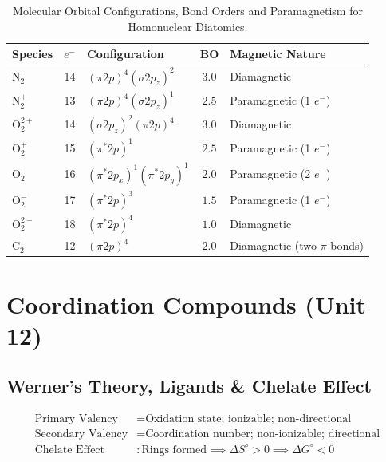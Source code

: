 \documentclass[10pt,twoside,openright]{book}
\begin{document}
\begin{table}[htbp]
\centering
{\fontsize{7.5pt}{9.0pt}\selectfont\setlength{\tabcolsep}{1.5pt}
\renewcommand{\arraystretch}{1.15}
\begin{tabularx}{\linewidth}{l c l c >{\RaggedRight}X}
\toprule
\textbf{Species} & \textbf{$e^-$} & \textbf{Configuration} & \textbf{BO} & \textbf{Magnetic Nature} \\
\midrule
$\text{N}_2$ & 14 & $(\pi 2p)^4 (\sigma 2p_z)^2$ & $3.0$ & Diamagnetic \\
$\text{N}_2^+$ & 13 & $(\pi 2p)^4 (\sigma 2p_z)^1$ & $2.5$ & Paramagnetic (1 $e^-$) \\
$\text{O}_2^{2+}$ & 14 & $(\sigma 2p_z)^2 (\pi 2p)^4$ & $3.0$ & Diamagnetic \\
$\text{O}_2^+$ & 15 & $(\pi^* 2p)^1$ & $2.5$ & Paramagnetic (1 $e^-$) \\
$\text{O}_2$ & 16 & $(\pi^* 2p_x)^1 (\pi^* 2p_y)^1$ & $2.0$ & Paramagnetic (2 $e^-$) \\
$\text{O}_2^-$ & 17 & $(\pi^* 2p)^3$ & $1.5$ & Paramagnetic (1 $e^-$) \\
$\text{O}_2^{2-}$ & 18 & $(\pi^* 2p)^4$ & $1.0$ & Diamagnetic \\
$\text{C}_2$ & 12 & $(\pi 2p)^4$ & $2.0$ & Diamagnetic (two $\pi$-bonds) \\
\bottomrule
\end{tabularx}}
\caption{Molecular Orbital Configurations, Bond Orders and Paramagnetism for Homonuclear Diatomics.}
\end{table}

\newpage

\section{Coordination Compounds (Unit 12)}

\subsection{Werner's Theory, Ligands \& Chelate Effect}

\begin{formulabox}
\begin{align}
  \text{Primary Valency} &= \text{Oxidation state; ionizable; non-directional} \\
  \text{Secondary Valency} &= \text{Coordination number; non-ionizable; directional} \\
  \text{Chelate Effect} &: \text{Rings formed} \implies \Delta S^\circ > 0 \implies \Delta G^\circ < 0
\end{align}
\end{formulabox}
\end{document}
